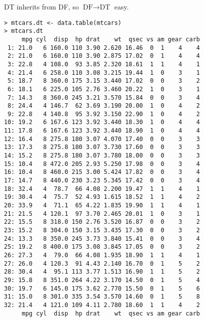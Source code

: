 \documentclass[12pt]{beamer}
\begin{document}
\begin{frame}[fragile]
DT inherits from DF, so $\text{DF} \rightarrow \text{DT}$ easy.

\pause
\begin{verbatim}
> mtcars.dt <- data.table(mtcars)
> mtcars.dt
     mpg cyl  disp  hp drat    wt  qsec vs am gear carb
 1: 21.0   6 160.0 110 3.90 2.620 16.46  0  1    4    4
 2: 21.0   6 160.0 110 3.90 2.875 17.02  0  1    4    4
 3: 22.8   4 108.0  93 3.85 2.320 18.61  1  1    4    1
 4: 21.4   6 258.0 110 3.08 3.215 19.44  1  0    3    1
 5: 18.7   8 360.0 175 3.15 3.440 17.02  0  0    3    2
 6: 18.1   6 225.0 105 2.76 3.460 20.22  1  0    3    1
 7: 14.3   8 360.0 245 3.21 3.570 15.84  0  0    3    4
 8: 24.4   4 146.7  62 3.69 3.190 20.00  1  0    4    2
 9: 22.8   4 140.8  95 3.92 3.150 22.90  1  0    4    2
10: 19.2   6 167.6 123 3.92 3.440 18.30  1  0    4    4
11: 17.8   6 167.6 123 3.92 3.440 18.90  1  0    4    4
12: 16.4   8 275.8 180 3.07 4.070 17.40  0  0    3    3
13: 17.3   8 275.8 180 3.07 3.730 17.60  0  0    3    3
14: 15.2   8 275.8 180 3.07 3.780 18.00  0  0    3    3
15: 10.4   8 472.0 205 2.93 5.250 17.98  0  0    3    4
16: 10.4   8 460.0 215 3.00 5.424 17.82  0  0    3    4
17: 14.7   8 440.0 230 3.23 5.345 17.42  0  0    3    4
18: 32.4   4  78.7  66 4.08 2.200 19.47  1  1    4    1
19: 30.4   4  75.7  52 4.93 1.615 18.52  1  1    4    2
20: 33.9   4  71.1  65 4.22 1.835 19.90  1  1    4    1
21: 21.5   4 120.1  97 3.70 2.465 20.01  1  0    3    1
22: 15.5   8 318.0 150 2.76 3.520 16.87  0  0    3    2
23: 15.2   8 304.0 150 3.15 3.435 17.30  0  0    3    2
24: 13.3   8 350.0 245 3.73 3.840 15.41  0  0    3    4
25: 19.2   8 400.0 175 3.08 3.845 17.05  0  0    3    2
26: 27.3   4  79.0  66 4.08 1.935 18.90  1  1    4    1
27: 26.0   4 120.3  91 4.43 2.140 16.70  0  1    5    2
28: 30.4   4  95.1 113 3.77 1.513 16.90  1  1    5    2
29: 15.8   8 351.0 264 4.22 3.170 14.50  0  1    5    4
30: 19.7   6 145.0 175 3.62 2.770 15.50  0  1    5    6
31: 15.0   8 301.0 335 3.54 3.570 14.60  0  1    5    8
32: 21.4   4 121.0 109 4.11 2.780 18.60  1  1    4    2
     mpg cyl  disp  hp drat    wt  qsec vs am gear carb
\end{verbatim}
\end{frame}
\end{document}
